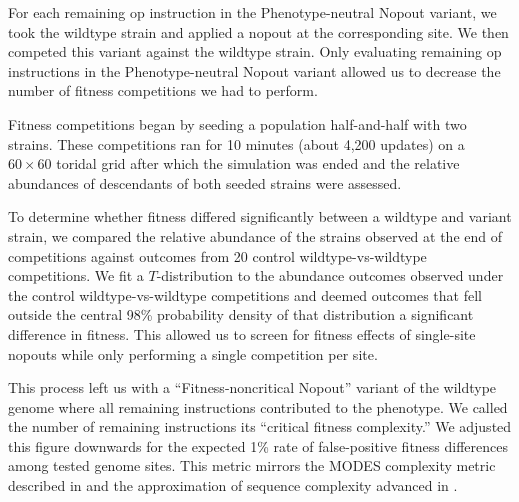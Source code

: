 For each remaining op instruction in the Phenotype-neutral Nopout variant, we took the wildtype strain and applied a nopout at the corresponding site.
We then competed this variant against the wildtype strain.
Only evaluating remaining op instructions in the Phenotype-neutral Nopout variant allowed us to decrease the number of fitness competitions we had to perform.

Fitness competitions began by seeding a population half-and-half with two strains.
These competitions ran for 10 minutes (about 4,200 updates) on a $60\times60$ toridal grid after which the simulation was ended and the relative abundances of descendants of both seeded strains were assessed.

To determine whether fitness differed significantly between a wildtype and variant strain, we compared the relative abundance of the strains observed at the end of competitions against outcomes from 20 control wildtype-vs-wildtype competitions.
We fit a $T$-distribution to the abundance outcomes observed under the control wildtype-vs-wildtype competitions and deemed outcomes that fell outside the central 98\% probability density of that distribution a significant difference in fitness.
This allowed us to screen for fitness effects of single-site nopouts while only performing a single competition per site.

This process left us with a ``Fitness-noncritical Nopout'' variant of the wildtype genome where all remaining instructions contributed to the phenotype.
We called the number of remaining instructions its ``critical fitness complexity.''
We adjusted this figure downwards for the expected 1\% rate of false-positive fitness differences among tested genome sites.
This metric mirrors the MODES complexity metric described in \citep{dolson2019modes} and the approximation of sequence complexity advanced in \citep{adami2000evolution}.



